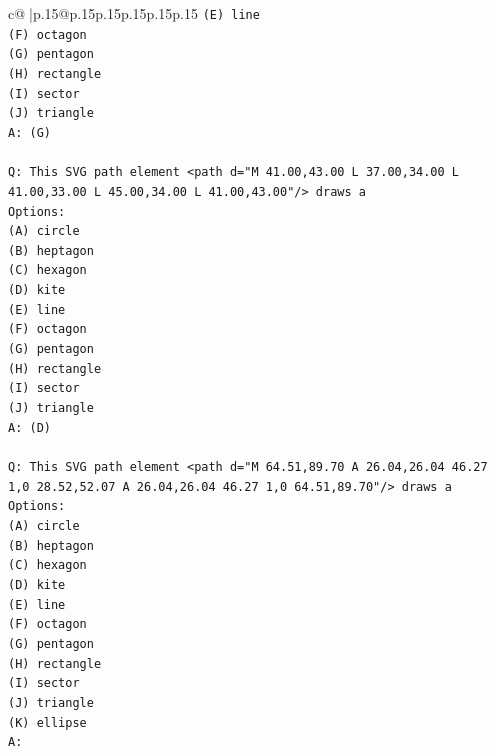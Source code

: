 \documentclass{article}
\begin{document}
{\begin{supertabular}{c@{$\;$}|p{.15\linewidth}@{}p{.15\linewidth}p{.15\linewidth}p{.15\linewidth}p{.15\linewidth}p{.15\linewidth}}
{{{\texttt{(E) line} \\
\texttt{(F) octagon} \\
\texttt{(G) pentagon} \\
\texttt{(H) rectangle} \\
\texttt{(I) sector} \\
\texttt{(J) triangle} \\
\texttt{A: (G)} \\
\\ 
\texttt{Q: This SVG path element <path d="M 41.00,43.00 L 37.00,34.00 L 41.00,33.00 L 45.00,34.00 L 41.00,43.00"/> draws a} \\
\texttt{Options:} \\
\texttt{(A) circle} \\
\texttt{(B) heptagon} \\
\texttt{(C) hexagon} \\
\texttt{(D) kite} \\
\texttt{(E) line} \\
\texttt{(F) octagon} \\
\texttt{(G) pentagon} \\
\texttt{(H) rectangle} \\
\texttt{(I) sector} \\
\texttt{(J) triangle} \\
\texttt{A: (D)} \\
\\ 
\texttt{Q: This SVG path element <path d="M 64.51,89.70 A 26.04,26.04 46.27 1,0 28.52,52.07 A 26.04,26.04 46.27 1,0 64.51,89.70"/> draws a} \\
\texttt{Options:} \\
\texttt{(A) circle} \\
\texttt{(B) heptagon} \\
\texttt{(C) hexagon} \\
\texttt{(D) kite} \\
\texttt{(E) line} \\
\texttt{(F) octagon} \\
\texttt{(G) pentagon} \\
\texttt{(H) rectangle} \\
\texttt{(I) sector} \\
\texttt{(J) triangle} \\
\texttt{(K) ellipse} \\
\texttt{A:} \\
            }
        }
    }
     \\ \\


\end{supertabular}}
\end{document}
